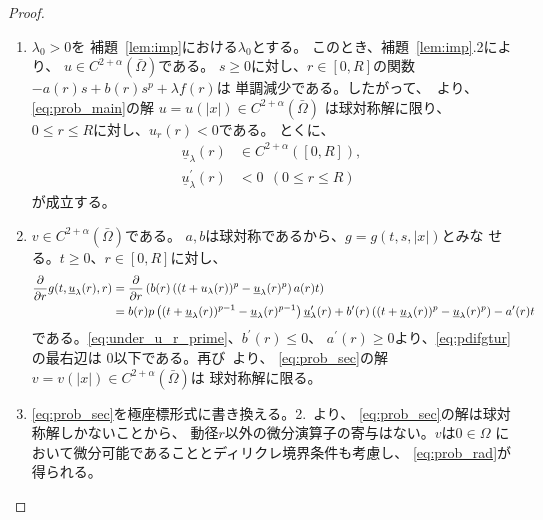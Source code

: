 \begin{proof}
 \begin{enumerate}[1.] \sage
  \item $\lambda_0 > 0$を
        補題~\ref{lem:imp}における$\lambda_0$とする。
        このとき、補題~\ref{lem:imp}.2により、
        $u \in C^{2+\alpha}(\bar{\Omega})$である。
        $s \geq 0$に対し、$r \in [0, R]$の関数
        $-a(r) s + b(r) s^p + \lambda f(r)$は
        単調減少である。したがって、\cite{MR544879}~より、
        \ref{eq:prob_main}の解
        $u = u(\lvert x \rvert) \in C^{2+\alpha}(\bar{\Omega})$
        は球対称解に限り、
        $0 \leq r \leq R$に対し、$u_r (r) < 0$である。
        とくに、
        \begin{align}
         \underline{u}_\lambda(r) & \in C^{2+ \alpha}([0, R]), 
          \label{eq:under_u_r} \\
         \underline{u}_\lambda^\prime(r) &< 0 \ \ (0 \leq r \leq R)
          \label{eq:under_u_r_prime}
        \end{align}
        が成立する。
  \item $v \in C^{2+\alpha}(\bar{\Omega})$である。
        $a, b$は球対称であるから、$g = g(t, s, \lvert x \rvert)$とみな
        せる。$t \geq 0$、$r \in [0, R]$に対し、
        \begin{align}
         \frac{\partial }{\partial r} g(t, \underline{u}_\lambda(r), r)
         &= \frac{\partial }{\partial r} \left( b(r) \left( (t + u_\lambda(r))^p -
         \underline{u}_\lambda(r)^p \right) a(r) t \right) \notag \\
         &= b(r) p \left( (t+ \underline{u}_\lambda(r))^{p-1} -
         \underline{u}_\lambda(r)^{p-1} \right)
         \underline{u}_\lambda^\prime(r) + b^\prime(r) \left( (t +
         \underline{u}_\lambda(r))^p  - \underline{u}_\lambda(r)^p
         \right) - a^\prime(r) t \label{eq:pdifgtur}
        \end{align}
        である。\eqref{eq:under_u_r_prime}、$b^\prime(r) \leq 0$、
        $a^\prime(r) \geq 0$より、\eqref{eq:pdifgtur}の最右辺は
        $0$以下である。再び\cite{MR544879}~より、
        \ref{eq:prob_sec}の解
        $v = v(\lvert x \rvert) \in C^{2+\alpha}(\bar{\Omega})$は
        球対称解に限る。
  \item \ref{eq:prob_sec}を極座標形式に書き換える。2.~より、
        \ref{eq:prob_sec}の解は球対称解しかないことから、
        動径$r$以外の微分演算子の寄与はない。$v$は$0 \in \Omega$
        において微分可能であることとディリクレ境界条件も考慮し、
        \eqref{eq:prob_rad}が得られる。\qedhere
 \end{enumerate}
\end{proof}

